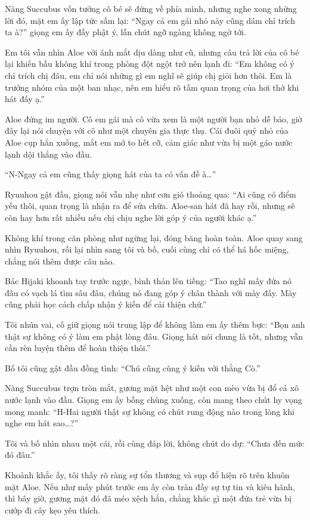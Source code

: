 \documentclass[../main.tex]{subfiles}
\begin{document}
Nàng Succubus vốn tưởng cô bé sẽ đứng về phía mình, nhưng nghe xong những lời đó, mặt em ấy lập tức sầm lại: ``Ngay cả em gái nhỏ này cũng dám chỉ trích ta à?'' giọng em ấy đầy phật ý, lẫn chút ngỡ ngàng không ngờ tới.

Em tôi vẫn nhìn Aloe với ánh mắt dịu dàng như cũ, nhưng câu trả lời của cô bé lại khiến bầu không khí trong phòng đột ngột trở nên lạnh đi: ``Em không có ý chỉ trích chị đâu, em chỉ nói những gì em nghĩ sẽ giúp chị giỏi hơn thôi. Em là trưởng nhóm của một ban nhạc, nên em hiểu rõ tầm quan trọng của hơi thở khi hát đấy ạ.''

Aloe đứng im người. Cô em gái mà cô vừa xem là một người bạn nhỏ dễ bảo, giờ đây lại nói chuyện với cô như một chuyên gia thực thụ. Cái đuôi quỷ nhỏ của Aloe cụp hẳn xuống, mắt em mở to hết cỡ, cảm giác như vừa bị một gáo nước lạnh dội thẳng vào đầu.

``N-Ngay cả em cũng thấy giọng hát của ta có vấn đề à\dots''

Ryuuhou gật đầu, giọng nói vẫn nhẹ như cơn gió thoảng qua: ``Ai cũng có điểm yếu thôi, quan trọng là nhận ra để sửa chữa. Aloe-san hát đã hay rồi, nhưng sẽ còn hay hơn rất nhiều nếu chị chịu nghe lời góp ý của người khác ạ.''

Không khí trong căn phòng như ngừng lại, đóng băng hoàn toàn. Aloe quay sang nhìn Ryuuhou, rồi lại nhìn sang tôi và bố, cuối cùng chỉ có thể há hốc miệng, chẳng nói thêm được câu nào.

Bác Hijaki khoanh tay trước ngực, bình thản lên tiếng: ``Tao nghĩ mấy đứa nó đâu có vạch lá tìm sâu đâu, chúng nó đang góp ý chân thành với mày đấy. Mày cũng phải học cách chấp nhận ý kiến để cải thiện chứ.''

Tôi nhún vai, cố giữ giọng nói trung lập để không làm em ấy thêm bực: ``Bọn anh thật sự không có ý làm em phật lòng đâu. Giọng hát nói chung là tốt, nhưng vẫn cần rèn luyện thêm để hoàn thiện thôi.''

Bố tôi cũng gật đầu đồng tình: ``Chú cũng cùng ý kiến với thằng Cò.''

Nàng Succubus trợn tròn mắt, gương mặt hệt như một con mèo vừa bị đổ cả xô nước lạnh vào đầu. Giọng em ấy bỗng chùng xuống, còn mang theo chút hy vọng mong manh: ``H-Hai người thật sự không có chút rung động nào trong lòng khi nghe em hát sao\dots?''

Tôi và bố nhìn nhau một cái, rồi cùng đáp lời, không chút do dự: ``Chưa đến mức đó đâu.''

Khoảnh khắc ấy, tôi thấy rõ ràng sự tổn thương và sụp đổ hiện rõ trên khuôn mặt Aloe. Nếu như mấy phút trước em ấy còn tràn đầy sự tự tin và kiêu hãnh, thì bây giờ, gương mặt đó đã méo xệch hẳn, chẳng khác gì một đứa trẻ vừa bị cướp đi cây kẹo yêu thích.
\end{document}
